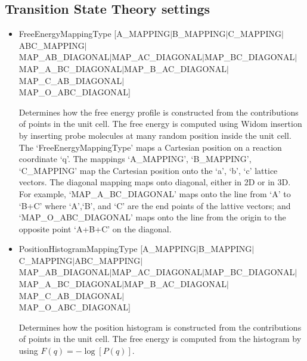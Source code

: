 \subsection*{Transition State Theory settings}
\begin{itemize}
\item{\begin{minipage}{\textwidth}
      FreeEnergyMappingType  [A\_MAPPING$|$B\_MAPPING$|$C\_MAPPING$|$ABC\_MAPPING$|$\\
        \hspace*{4cm}MAP\_AB\_DIAGONAL$|$MAP\_AC\_DIAGONAL$|$MAP\_BC\_DIAGONAL$|$\\
        \hspace*{4cm}MAP\_A\_BC\_DIAGONAL$|$MAP\_B\_AC\_DIAGONAL$|$MAP\_C\_AB\_DIAGONAL$|$\\
        \hspace*{4cm}MAP\_O\_ABC\_DIAGONAL]
      \end{minipage}
      }
Determines how the free energy profile is constructed from the contributions of points in the unit cell.
The free energy is computed using Widom insertion by inserting probe molecules
at many random position inside the unit cell. The `FreeEnergyMappingType' maps a Cartesian position on a reaction coordinate `q'.
The mappings `A\_MAPPING', `B\_MAPPING', `C\_MAPPING' map the Cartesian position onto the `a', `b', `c' lattice vectors.
The diagonal mapping maps onto diagonal, either in 2D or in 3D. For example, `MAP\_A\_BC\_DIAGONAL' maps onto the line from `A' to `B+C' where
`A',`B', and `C' are the end points of the lattive vectors; and `MAP\_O\_ABC\_DIAGONAL' maps onto the line from the origin to the opposite point `A+B+C' on the diagonal.
\item{\begin{minipage}{\textwidth}
      PositionHistogramMappingType  [A\_MAPPING$|$B\_MAPPING$|$C\_MAPPING$|$ABC\_MAPPING$|$\\
        \hspace*{4cm}MAP\_AB\_DIAGONAL$|$MAP\_AC\_DIAGONAL$|$MAP\_BC\_DIAGONAL$|$\\
        \hspace*{4cm}MAP\_A\_BC\_DIAGONAL$|$MAP\_B\_AC\_DIAGONAL$|$MAP\_C\_AB\_DIAGONAL$|$\\
        \hspace*{4cm}MAP\_O\_ABC\_DIAGONAL]
      \end{minipage}
      }
Determines how the position histogram is constructed from the contributions of points in the unit cell.
The free energy is computed from the histogram by using $F(q)=-\log\left[P\left(q\right)\right]$.

\end{itemize}
